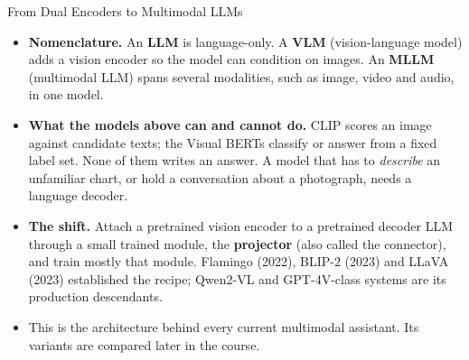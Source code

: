 \begin{frame}{From Dual Encoders to Multimodal LLMs}
  \begin{itemize}
    \item[{\color{red}\textbullet}] \textbf{Nomenclature.} An \textbf{LLM} is language-only. A
      \textbf{VLM} (vision-language model) adds a vision encoder so the model can condition on images.
      An \textbf{MLLM} (multimodal LLM) spans several modalities, such as image, video and audio, in one model.
    \item[{\color{red}\textbullet}] \textbf{What the models above can and cannot do.} CLIP scores an
      image against candidate texts; the Visual BERTs classify or answer from a fixed label set. None of
      them writes an answer. A model that has to \emph{describe} an unfamiliar chart, or hold a
      conversation about a photograph, needs a language decoder.
    \item[{\color{red}\textbullet}] \textbf{The shift.} Attach a pretrained vision encoder to a
      pretrained decoder LLM through a small trained module, the \textbf{projector} (also called the
      connector), and train mostly that module. Flamingo (2022), BLIP-2 (2023) and LLaVA (2023)
      established the recipe; Qwen2-VL and GPT-4V-class systems are its production descendants.
    \item[{\color{red}\textbullet}] This is the architecture behind every current multimodal assistant.
      Its variants are compared later in the course.
  \end{itemize}
\end{frame}
